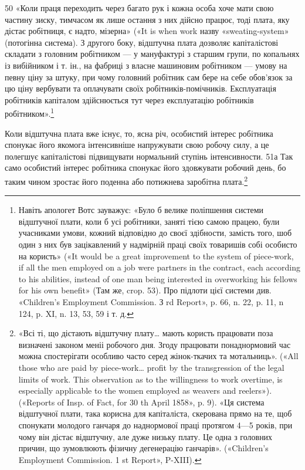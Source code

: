 50 «Коли праця переходить через багато рук і кожна особа хоче
мати свою частину зиску, тимчасом як лише остання з них дійсно працює,
тоді плата, яку дістає робітниця, є надто, мізерна» («It is when work
назву «sweating-system» (потогінна система). З другого боку,
відштучна плата дозволяє капіталістові складати з головним робітником
— у мануфактурі з старшим групи, по копальнях із
вибійником і т. ін., на фабриці з власне машиновим робітником —
умову на певну ціну за штуку, при чому головний робітник сам
бере на себе обов’язок за цю ціну вербувати та оплачувати своїх
робітників-помічників. Експлуатація робітників капіталом здійснюється
тут через експлуатацію робітників робітником».\footnote{
Навіть апологет Вотс зауважує: «Було б велике поліпшення
системи відштучної плати, коли б усі робітники, заняті тією самою працею,
були учасниками умови, кожний відповідно до своєї здібности, замість
того, шоб один з них був зацікавлений у надмірній праці своїх
товаришів собі особисто на користь» («It would be a great improvement
to the system of piece-work, if all the men employed on a job were partners
in the contract, each according to his abilities, instead of one man
being interested in overworking his fellows for his own benefit» (Там же,
crop. 53). Про підлоти цієї системи див. «Children’s Employment Commission.
З rd Report», p. 66, n. 22, p. 11, n 124, p. XI, n. 13, 53, 59 і т. д.
}

Коли відштучна плата вже існує, то, ясна річ, особистий інтерес
робітника спонукає його якомога інтенсивніше напружувати
свою робочу силу, а це полегшує капіталістові підвищувати нормальний
ступінь інтенсивности. 51а Так само особистий інтерес
робітника спонукає його здовжувати робочий день, бо таким
чином зростає його поденна або потижнева заробітна плата.\footnote{
«Всі ті, що дістають відштучну плату\dots{} мають користь працювати
поза визначені законом меніі робочого дня. Згоду працювати понаднормовий
час можна спостерігати особливо часто серед жінок-ткачих та мотальниць».
(«All those who are paid by piece-work\dots{} profit by the transgression
of the legal limits of work. This observation as to the willingness
to work overtime, is especially applicable to the women employed as weavers
and reelers»). («Reports of Insp. of Fact, for 30 th April 1858», p. 9).
«Ця система відштучної плати, така корисна для капіталіста, скерована
прямо на те, щоб спонукати молодого ганчаря до наднормової праці
протягом 4—5 років, при чому він дістає відштучну, але дуже низьку плату.
Це одна з головних причин, що зумовлюють фізичну дегенерацію ганчарів».
(«Children’s Employment Commission. 1 st Report», P-XIII).
}

